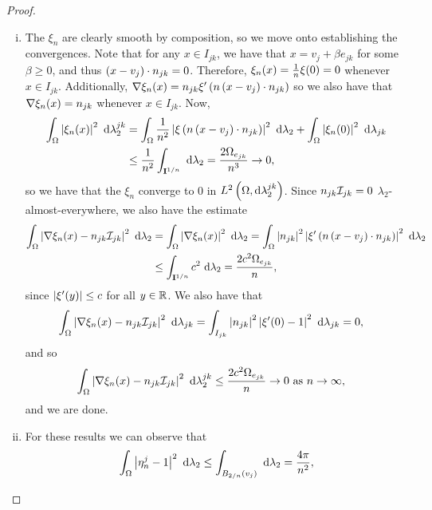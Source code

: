 \begin{proof}
	\begin{enumerate}[(i)]
		\item The $\xi_n$ are clearly smooth by composition, so we move onto establishing the convergences.
		Note that for any $x\in I_{jk}$, we have that $x = v_j + \beta e_{jk}$ for some $\beta\geq0$, and thus $\left( x-v_j \right)\cdot n_{jk} = 0$.
		Therefore, $\xi_n(x) = \frac{1}{n}\xi(0) = 0$ whenever $x\in I_{jk}$.
		Additionally, $\nabla\xi_n(x) = n_{jk}\xi'\left( n\left( x-v_j \right)\cdot n_{jk} \right)$ so we also have that $\nabla\xi_n(x) = n_{jk}$ whenever $x\in I_{jk}$.
		Now,
		\begin{align*}
			\int_{\Omega} \left\lvert \xi_n(x) \right\rvert^2  \ \mathrm{d}\lambda_2^{jk}
			&= \int_{\Omega} \frac{1}{n^2}\left\lvert \xi\left( n\left( x-v_j \right)\cdot n_{jk} \right) \right\rvert^2  \ \mathrm{d}\lambda_2
			+ \int_{\Omega} \left\lvert \xi_n(0) \right\rvert^2  \ \mathrm{d}\lambda_{jk} \\
			&\leq \frac{1}{n^2}\int_{\mathbf{I}^{1/n}}  \ \mathrm{d}\lambda_2 = \frac{2\Omega_{e_{jk}}}{n^3} \rightarrow 0,
		\end{align*}
		so we have that the $\xi_n$ converge to 0 in $L^{2}\left( \Omega,\mathrm{d} \lambda_2^{jk} \right)$.
		Since $n_{jk}\mathcal{I}_{jk}=0$ $\lambda_2$-almost-everywhere, we also have the estimate
		\begin{align*}
			\int_{\Omega} \left\lvert  \nabla\xi_n(x) - n_{jk}\mathcal{I}_{jk}  \right\rvert^2  \ \mathrm{d}\lambda_2
			&= \int_{\Omega} \left\lvert  \nabla\xi_n(x)  \right\rvert^2  \ \mathrm{d}\lambda_2
			= \int_{\Omega} \left\lvert n_{jk} \right\rvert^2\left\lvert \xi'\left( n\left( x-v_j \right)\cdot n_{jk} \right) \right\rvert^2  \ \mathrm{d}\lambda_2 \\
			&\leq \int_{\mathbf{I}^{1/n}} c^2  \ \mathrm{d}\lambda_2 
			= \frac{2c^2\Omega_{e_{jk}}}{n},
		\end{align*}
		since $\left\lvert \xi'(y) \right\rvert\leq c$ for all $y\in\mathbb{R}$.
		We also have that
		\begin{align*}
			\int_{\Omega} \left\lvert  \nabla\xi_n(x) - n_{jk}\mathcal{I}_{jk}  \right\rvert^2  \ \mathrm{d}\lambda_{jk}
			&= \int_{I_{jk}} \left\lvert n_{jk} \right\rvert^2\left\lvert  \xi'(0)-1  \right\rvert^2  \ \mathrm{d}\lambda_{jk} = 0,
		\end{align*}
		and so
		\begin{align*}
			\int_{\Omega} \left\lvert  \nabla\xi_n(x) - n_{jk}\mathcal{I}_{jk}  \right\rvert^2  \ \mathrm{d}\lambda_2^{jk}
			&\leq \frac{2c^2\Omega_{e_{jk}}}{n} \rightarrow 0 \ \text{as} \ n \rightarrow\infty,
		\end{align*}
		and we are done.
		\item For these results we can observe that
		\begin{align*}
			\integral{\ddom}{\abs{ \eta_n^j - 1 }^2}{\lambda_2}
			&\leq \integral{B_{2/n}(v_j)}{}{\lambda_2} = \frac{4\pi}{n^2}, \\

\end{align*}
\end{enumerate}
\end{proof}
